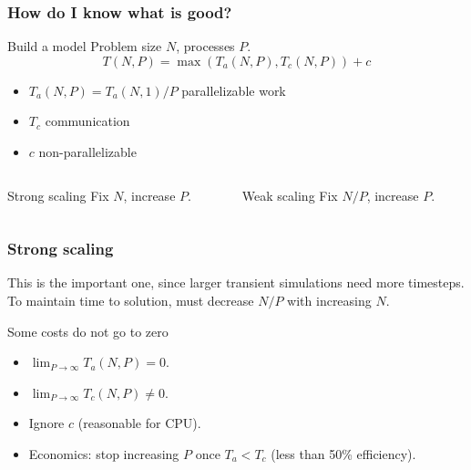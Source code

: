 \documentclass[presentation]{beamer}
\begin{document}
\begin{frame}
  \frametitle{How do I know what is good?}

  \begin{block}{Build a model \parencite{Fischer:2015}}
    Problem size $N$, processes $P$.
    \begin{equation*}
      T(N, P) = \max{(T_a(N, P), T_c(N, P))} + c
    \end{equation*}
    \begin{itemize}
    \item $T_a(N, P) = T_a(N, 1)/P$ parallelizable work
    \item $T_c$ communication
    \item $c$ non-parallelizable
    \end{itemize}
  \end{block}
  \begin{center}
    \begin{columns}
      \begin{column}{0.4\textwidth}
        \begin{block}{Strong scaling}
          Fix $N$, increase $P$.
        \end{block}
      \end{column}
      \begin{column}{0.4\textwidth}
        \begin{block}{Weak scaling}
          Fix $N/P$, increase $P$.
        \end{block}
      \end{column}
    \end{columns}
  \end{center}
\end{frame}
\begin{frame}
  \frametitle{Strong scaling}
  This is the important one, since larger transient simulations need
  more timesteps.  To maintain time to solution, must decrease $N/P$
  with increasing $N$.

  \begin{block}{Some costs do not go to zero}
    \begin{itemize}
    \item $\lim_{P\rightarrow \infty} T_a(N, P) = 0$.
    \item $\lim_{P\rightarrow\infty} T_c(N, P) \ne 0$.
    \item Ignore $c$ (reasonable for CPU).
    \item Economics: stop increasing $P$ once $T_a < T_c$ (less than
      50\% efficiency).
    \end{itemize}
  \end{block}
\end{frame}
\end{document}
